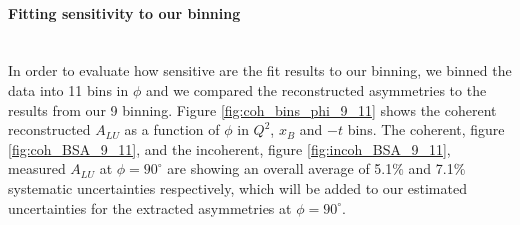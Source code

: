 \paragraph{Fitting sensitivity to our binning} ~\\
In order to evaluate how sensitive are the fit results to our binning, we 
binned the data into 11 bins in $\phi$ and we compared the reconstructed 
asymmetries to the results from our 9 binning. Figure 
\ref{fig:coh_bins_phi_9_11} shows the coherent reconstructed $A_{LU}$ as a 
function of $\phi$ in $Q^{2}$, $x_B$ and $-t$ bins.  The coherent, figure 
\ref{fig:coh_BSA_9_11}, and the incoherent, figure \ref{fig:incoh_BSA_9_11}, 
measured $A_{LU}$ at $\phi = 90 ^{\circ}$ are showing an overall average of 
5.1$\%$ and 7.1$\%$ systematic uncertainties respectively, which will be added 
to our estimated uncertainties for the extracted asymmetries at $\phi = 
90^{\circ}$.




